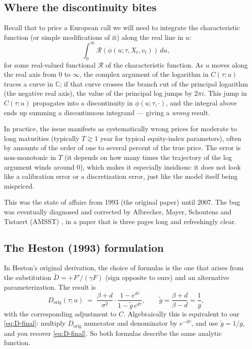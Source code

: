 \documentclass[11pt]{article}
\theoremstyle{plain}
\theoremstyle{definition}
\theoremstyle{remark}
\begin{document}
\subsection{Where the discontinuity bites}

Recall that to price a European call we will need to integrate the characteristic function (or simple modifications of it) along the real line in \(u\):
\[
    \int_0^\infty \mathcal{R}(\phi(u; \tau, X_t, v_t)) \, du,
\]
for some real-valued functional \(\mathcal{R}\) of the characteristic function. As \(u\) moves along the real axis from \(0\) to \(\infty\), the complex argument of the logarithm in \(C(\tau; u)\) traces a curve in \(\mathbb{C}\); if that curve crosses the branch cut of the principal logarithm (the negative real axis), the value of the principal log jumps by \(2\pi i\). This jump in \(C(\tau; u)\) propagates into a discontinuity in \(\phi(u; \tau, \cdot)\), and the integral above ends up summing a discontinuous integrand --- giving a \emph{wrong} result.

In practice, the issue manifests as systematically wrong prices for moderate to long maturities (typically \(T \gtrsim 1\) year for typical equity-index parameters), often by amounts of the order of one to several percent of the true price. The error is non-monotonic in \(T\) (it depends on how many times the trajectory of the log argument winds around \(0\)), which makes it especially insidious: it does not look like a calibration error or a discretization error, just like the model itself being mispriced.

This was the state of affairs from 1993 (the original paper) until 2007. The bug was eventually diagnosed and corrected by Albrecher, Mayer, Schoutens and Tistaert (AMSST) \cite{AMSS2007}, in a paper that is three pages long and refreshingly clear.

\subsection{The Heston (1993) formulation}

In Heston's original derivation, the choice of formulas is the one that arises from the substitution \(\tilde D = +F'/(\gamma F)\) (sign opposite to ours) and an alternative parameterization. The result is
\[
    D_{\text{orig}}(\tau; u) \;=\; \frac{\beta + d}{\sigma^2} \cdot \frac{1 - e^{d \tau}}{1 - \tilde g \, e^{d \tau}}, \qquad \tilde g = \frac{\beta + d}{\beta - d} = \frac{1}{g},
\]
with the corresponding adjustment to \(C\). Algebraically this is equivalent to our \eqref{eq:D-final}: multiply \(D_{\text{orig}}\) numerator and denominator by \(e^{-d \tau}\), and use \(\tilde g = 1/g\), and you recover \eqref{eq:D-final}. So both formulas describe the same analytic function.
\end{document}
